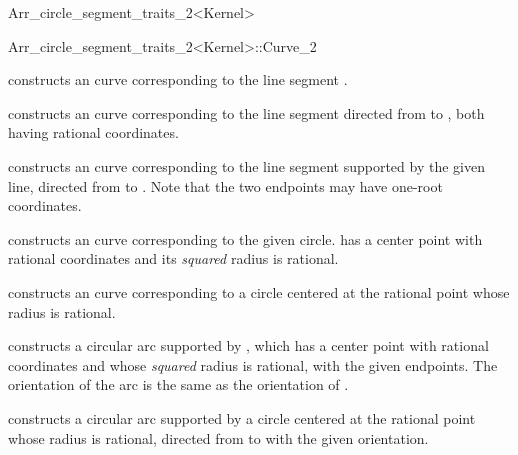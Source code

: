 \begin{ccRefClass}{Arr_circle_segment_traits_2<Kernel>}
\begin{ccClass}{Arr_circle_segment_traits_2<Kernel>::Curve_2}
\ccCreation
{}

    {constructs an curve corresponding to the line segment .}

    {constructs an curve corresponding to the line segment directed
     from  to , both having rational coordinates.}

    {constructs an curve corresponding to the line segment supported by
     the given line, directed from  to .
     Note that the two endpoints may have one-root coordinates.
     }

    {constructs an curve corresponding to the given circle. 
     has a center point with rational coordinates and its {\em squared}
     radius is rational.}

    {constructs an curve corresponding to a circle centered at the rational
     point  whose radius  is rational.}

    {constructs a circular arc supported by , which has a
     center point with rational coordinates and whose {\em squared}
     radius is rational, with the given endpoints. The orientation of the
     arc is the same as the orientation of .
     }

    {constructs a circular arc supported by a circle centered at the rational
     point  whose radius  is rational, directed from
      to  with the given orientation.
     }


\end{ccClass}
\end{ccRefClass}
